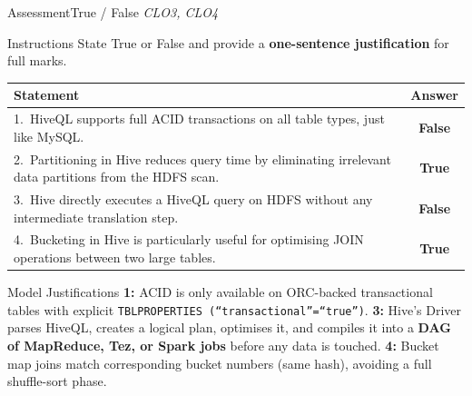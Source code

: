 \documentclass[aspectratio=169,10pt]{beamer}
\begin{document}
\begin{frame}{Assessment\textemdash True / False \hfill\small\textit{CLO3, CLO4}}
  \begin{block}{Instructions}
    State True or False and provide a \textbf{one-sentence justification} for full marks.
  \end{block}
  \vspace{6pt}
  \centering
  \renewcommand{\arraystretch}{1.6}
  \begin{tabular}{p{9.0cm}c}
    \toprule
    \textbf{Statement} & \textbf{Answer} \\
    \midrule
    1.\ HiveQL supports full ACID transactions on all table types, just like MySQL. &
    \alert{\textbf{False}} \\
    2.\ Partitioning in Hive reduces query time by eliminating irrelevant data partitions from the HDFS scan. &
    \textbf{True} \\
    3.\ Hive directly executes a HiveQL query on HDFS without any intermediate translation step. &
    \alert{\textbf{False}} \\
    4.\ Bucketing in Hive is particularly useful for optimising JOIN operations between two large tables. &
    \textbf{True} \\
    \bottomrule
  \end{tabular}
  \vspace{6pt}
  \begin{exampleblock}{Model Justifications}
    \small \textbf{1:} ACID is only available on ORC-backed transactional tables with explicit \texttt{TBLPROPERTIES (``transactional''=``true'')}.  \textbf{3:} Hive's Driver parses HiveQL, creates a logical plan, optimises it, and compiles it into a \textbf{DAG of MapReduce, Tez, or Spark jobs} before any data is touched.  \textbf{4:} Bucket map joins match corresponding bucket numbers (same hash), avoiding a full shuffle-sort phase.
  \end{exampleblock}
\end{frame}
\end{document}
